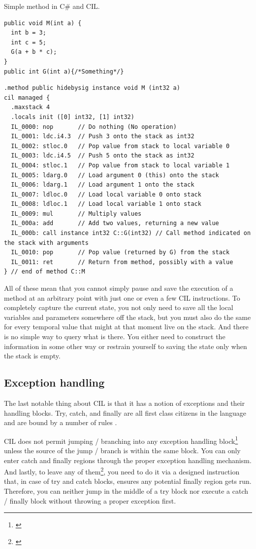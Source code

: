 \begin{listing}[h]
	\caption{Simple method in C\# and CIL.}
	\label{list2.1}
\begin{verbatim}
public void M(int a) {
  int b = 3;
  int c = 5;    
  G(a + b * c);
}
public int G(int a){/*Something*/}
\end{verbatim}
\begin{verbatim}
.method public hidebysig instance void M (int32 a) 
cil managed {
  .maxstack 4
  .locals init ([0] int32, [1] int32)
  IL_0000: nop       // Do nothing (No operation)
  IL_0001: ldc.i4.3  // Push 3 onto the stack as int32
  IL_0002: stloc.0   // Pop value from stack to local variable 0
  IL_0003: ldc.i4.5  // Push 5 onto the stack as int32
  IL_0004: stloc.1   // Pop value from stack to local variable 1
  IL_0005: ldarg.0   // Load argument 0 (this) onto the stack
  IL_0006: ldarg.1   // Load argument 1 onto the stack
  IL_0007: ldloc.0   // Load local variable 0 onto stack
  IL_0008: ldloc.1   // Load local variable 1 onto stack
  IL_0009: mul       // Multiply values
  IL_000a: add       // Add two values, returning a new value
  IL_000b: call instance int32 C::G(int32) // Call method indicated on the stack with arguments
  IL_0010: pop       // Pop value (returned by G) from the stack
  IL_0011: ret       // Return from method, possibly with a value
} // end of method C::M
\end{verbatim}
\end{listing}

All of these mean that you cannot simply pause and save the execution of a method at an arbitrary point with just one or even a few CIL instructions. To completely capture the current state, you not only need to save all the local variables and parameters somewhere off the stack, but you must also do the same for every temporal value that might at that moment live on the stack. And there is no simple way to query what is there. You either need to construct the information in some other way or restrain yourself to saving the state only when the stack is empty.

\subsection{Exception handling}

The last notable thing about CIL is that it has a notion of exceptions and their handling blocks. Try, catch, and finally are all first class citizens in the language and are bound by a number of rules \citep[Sec. I.12.4]{CLIEcma}.

CIL does not permit jumping / branching into any exception handling block\footnote{\citep[Sec. I.12.4.2.8.2.7]{CLIEcma}} unless the source of the jump / branch is within the same block. You can only enter catch and finally regions through the proper exception handling mechanism. And lastly, to leave any of them\footnote{\citep[Sec. I.12.4.2.8.2.8]{CLIEcma}}, you need to do it via a designed instruction that, in case of try and catch blocks, ensures any potential finally region gets run. Therefore, you can neither jump in the middle of a try block nor execute a catch / finally block without throwing a proper exception first.

